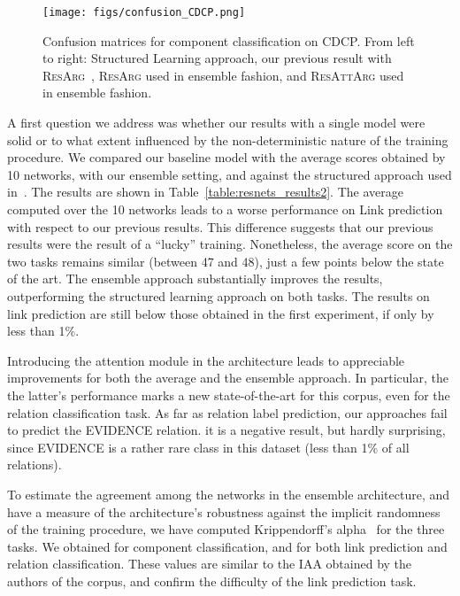\documentclass[journal]{IEEEtran}
\begin{document}
\begin{figure*}[t]
  \centering
  \texttt{[image: figs/confusion\_CDCP.png]}
  \caption[Confusion matrices for component classification on CDCP.]{Confusion matrices for component classification on CDCP. From left to right: Structured Learning approach, our previous result with \textsc{ResArg}~\cite{W18-5201}, \textsc{ResArg} used in ensemble fashion, and \textsc{ResAttArg} used in ensemble fashion.
  \label{fig:confusion}}
\end{figure*}

A first question we address was whether our results with a single model were solid or to what extent influenced by the non-deterministic nature of the training procedure. We compared our baseline model with the average scores obtained by 10 networks, with our ensemble setting, and against the structured approach used in~\cite{DBLP:conf/acl/NiculaePC17}.
The results are shown in Table~\ref{table:resnets_results2}.
The average computed over the 10 networks leads to a worse performance on Link prediction with respect to our previous results. This difference suggests that our previous results were the result of a ``lucky'' training. Nonetheless, the average score on the two tasks remains similar (between 47 and 48), just a few points below the state of the art.
The ensemble approach substantially improves the results, outperforming the structured learning approach on both tasks. The results on link prediction are still below those obtained in the first experiment, if only by less than 1\%.

Introducing the attention module in the architecture leads to appreciable improvements for both the average and the ensemble approach. In particular, the the latter's performance marks a new state-of-the-art for this corpus, even for the relation classification task.
As far as relation label prediction, our approaches fail to predict the EVIDENCE relation. it is a negative result, but hardly surprising, since EVIDENCE is a rather rare class in this dataset (less than 1\% of all relations).

To estimate the agreement among the networks in the ensemble architecture, and have a measure of the architecture's robustness against the implicit randomness of the training procedure, we have computed Krippendorff's alpha~\cite{kripp-alpha} for the three tasks. We obtained  for component classification, and  for both link prediction and relation classification. These values are similar to the IAA obtained by the authors of the corpus, and confirm the difficulty of the link prediction task.
\end{document}
